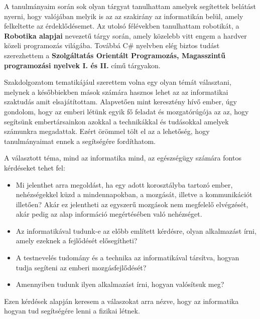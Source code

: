 \documentclass[tocnopagenum]{thesis-ekf}
\theoremstyle{definition}
\theoremstyle{remark}
\begin{document}
	A tanulmányaim során sok olyan tárgyat tanulhattam amelyek segítettek belátást nyerni, hogy valójában melyik is az az szakirány az informatikán belül, amely felkeltette az érdeklődésemet. Az utolsó félévekben tanulhattam robotikát, a \textbf{Robotika alapjai} nevezetű tárgy során, amely közelebb vitt engem a hardver közeli programozás világába. Továbbá C\# nyelvben elég biztos tudást szerezhettem a \textbf{Szolgáltatás Orientált Programozás, Magasszintű programozási nyelvek I. és II.} című tárgyakon.
	\par
	Szakdolgozatom tematikájául szerettem volna egy olyan témát választani, melynek a későbbiekben mások számára hasznos lehet az az informatikai szaktudás amit elsajátítottam.
	Alapvetően mint keresztény hívő ember, úgy gondolom, hogy az emberi létünk egyik fő feladat és mozgatórúgója az az, hogy segítsünk embertársainkon azokkal a technikákkal és tudásokkal amelyek számunkra megadattak. Ezért örömmel tölt el az a lehetőség, hogy tanulmányaimat ennek a segítségére fordíthatom. 
	\par
	A választott téma, mind az informatika mind, az egészségügy számára fontos kérdéseket tehet fel:
	\begin{itemize}
		\item  Mi jelenthet arra megoldást, ha egy adott korosztályba tartozó ember, nehézségekkel küzd a mindennapokban, a mozgását, illetve a kommunikációt illetően? Akár ez jelentheti az egyszerű mozgások nem megfelelő elvégzését, akár pedig az alap információ megértésében való nehézséget.
		\item  Az informatikával tudunk-e az előbb említett kérdésre, olyan alkalmazást írni, amely ezeknek a fejlődését elősegítheti?
		\item A testnevelés tudomány és a technika az informatikával társítva, hogyan tudja segíteni az emberi mozgásfejlődését?
		\item Amennyiben tudunk ilyen alkalmazást írni, hogyan valósítsuk meg?
	
	\end{itemize}
 	Ezen kérdések alapján keresem a válaszokat arra nézve, hogy az informatika hogyan tud segítségére lenni a fizikai létnek. 
 
\end{document}
